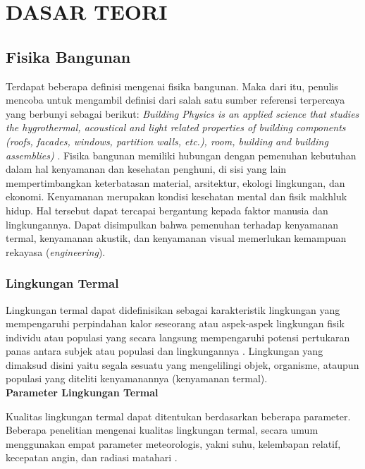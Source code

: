 \chapter{DASAR TEORI}
\label{dasar-teori}

\section{Fisika Bangunan}

Terdapat beberapa definisi mengenai fisika bangunan. Maka dari itu, penulis mencoba untuk mengambil definisi dari salah satu sumber referensi terpercaya yang berbunyi sebagai berikut: \textit{Building Physics is an applied science that studies the hygrothermal, acoustical and light related properties of building components (roofs, facades, windows, partition walls, etc.), room, building and building assemblies)} \cite{BuildingPhysics}. Fisika bangunan memiliki hubungan dengan pemenuhan kebutuhan dalam hal kenyamanan dan kesehatan penghuni, di sisi yang lain mempertimbangkan keterbatasan material, arsitektur, ekologi lingkungan, dan ekonomi. Kenyamanan merupakan kondisi kesehatan mental dan fisik makhluk hidup. Hal tersebut dapat tercapai bergantung kepada faktor manusia dan lingkungannya. Dapat disimpulkan bahwa pemenuhan terhadap kenyamanan termal, kenyamanan akustik, dan kenyamanan visual memerlukan kemampuan rekayasa (\textit{engineering}).

\subsection{Lingkungan Termal}

Lingkungan termal dapat didefinisikan sebagai karakteristik lingkungan yang mempengaruhi perpindahan kalor seseorang \cite{ASHRAE55} atau aspek-aspek lingkungan fisik individu atau populasi yang secara langsung mempengaruhi potensi pertukaran panas antara subjek atau populasi dan lingkungannya \cite{book1}. Lingkungan yang dimaksud disini yaitu segala sesuatu yang mengelilingi objek, organisme, ataupun populasi yang diteliti kenyamanannya (kenyamanan termal). \\

\noindent \textbf{Parameter Lingkungan Termal}

Kualitas lingkungan termal dapat ditentukan berdasarkan beberapa parameter. Beberapa penelitian mengenai kualitas lingkungan termal, secara umum menggunakan empat parameter meteorologis, yakni suhu, kelembapan relatif, kecepatan angin, dan radiasi matahari \cite{book1}.

